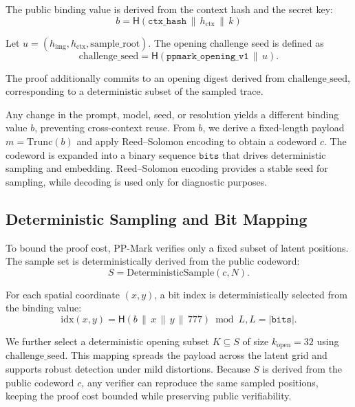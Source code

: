 \documentclass{article}
\theoremstyle{plain}
\theoremstyle{definition}
\theoremstyle{remark}
\begin{document}
The public binding value is derived from the context hash and the secret key:
\begin{equation}
b = \mathsf{H}(\texttt{ctx\_hash} \,\|\, h_{\mathrm{ctx}} \,\|\, k)
\label{eq:binding_relation}
\end{equation}

Let \(u = (h_{\mathrm{img}}, h_{\mathrm{ctx}}, \mathrm{sample\_root})\). The opening challenge seed is defined as
\begin{equation}
\mathrm{challenge\_seed} = \mathsf{H}(\texttt{ppmark\_opening\_v1} \,\|\, u).
\end{equation}

The proof additionally commits to an opening digest derived from \(\mathrm{challenge\_seed}\), corresponding to a deterministic subset of the sampled trace.

Any change in the prompt, model, seed, or resolution yields a different binding value \(b\), preventing cross-context reuse. From \(b\), we derive a fixed-length payload \(m = \mathrm{Trunc}(b)\) and apply Reed--Solomon encoding to obtain a codeword \(c\). The codeword is expanded into a binary sequence \(\mathtt{bits}\) that drives deterministic sampling and embedding. Reed--Solomon encoding provides a stable seed for sampling, while decoding is used only for diagnostic purposes.

\subsection{Deterministic Sampling and Bit Mapping}
To bound the proof cost, PP-Mark verifies only a fixed subset of latent positions. The sample
set is deterministically derived from the public codeword:
\begin{equation}
S = \mathrm{DeterministicSample}(c, N).
\end{equation}

For each spatial coordinate \((x,y)\), a bit index is deterministically selected from the
binding value:
\begin{equation}
\mathrm{idx}(x,y) = \mathsf{H}(b \,\|\, x \,\|\, y \,\|\, 777) \bmod L,
 L = |\mathtt{bits}|.
\end{equation}

We further select a deterministic opening subset \(K \subseteq S\) of size
\(k_{\mathrm{open}} = 32\) using \(\mathrm{challenge\_seed}\). This mapping spreads the payload across the latent grid and supports robust detection under mild distortions. Because \(S\) is derived from the public codeword \(c\), any verifier can reproduce the same sampled positions, keeping the proof cost bounded while preserving public verifiability.
  
\end{document}
